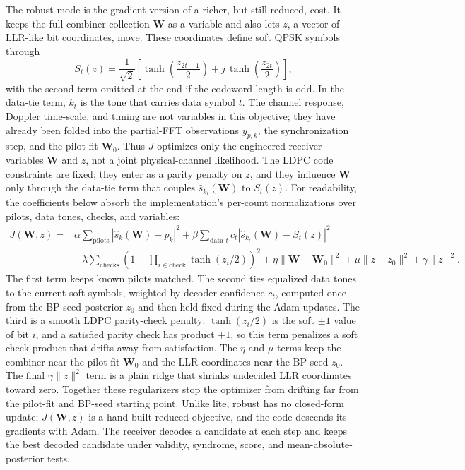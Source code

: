 \documentclass[11pt]{article}
\begin{document}
The robust mode is the gradient version of a richer, but still reduced, cost.
It keeps the full combiner collection \(\mathbf W\) as a variable and also lets
\(z\), a vector of LLR-like bit coordinates, move. These coordinates define
soft QPSK symbols through
\begin{equation}
  S_t(z)=\frac{1}{\sqrt{2}}\left[
    \tanh\!\left(\frac{z_{2t-1}}{2}\right)
    + j\,\tanh\!\left(\frac{z_{2t}}{2}\right)
  \right],
\end{equation}
with the second term omitted at the end if the codeword length is odd. In
the data-tie term, \(k_t\) is the tone that carries data symbol \(t\). The
channel response, Doppler time-scale, and timing are not variables in this
objective; they have already been folded into the partial-FFT observations
\(y_{p,k}\), the synchronization step, and the pilot fit \(\mathbf W_0\). Thus \(J\)
optimizes only the engineered receiver variables \(\mathbf W\) and \(z\), not a joint
physical-channel likelihood. The LDPC code constraints are fixed; they enter as
a parity penalty on \(z\), and they influence \(\mathbf W\) only through the
data-tie term that couples \(\hat{s}_{k_t}(\mathbf W)\) to \(S_t(z)\). For
readability, the coefficients below absorb the implementation's per-count
normalizations over pilots, data tones, checks, and variables:
\begin{equation}
\begin{aligned}
J(\mathbf W,z) ={}&
  \alpha\sum_{\text{pilots}}\left|\hat{s}_k(\mathbf W)-p_k\right|^2
  + \beta\sum_{\text{data }t} c_t
      \left|\hat{s}_{k_t}(\mathbf W)-S_t(z)\right|^2 \\
&+ \lambda\sum_{\text{checks}}
      \left(1-\prod_{i\in\text{check}}\tanh(z_i/2)\right)^2
  + \eta\|\mathbf W-\mathbf W_0\|^2
  + \mu\|z-z_0\|^2
  + \gamma\|z\|^2 .
\end{aligned}
\end{equation}
The first term keeps known pilots matched. The second ties equalized data tones
to the current soft symbols, weighted by decoder confidence \(c_t\), computed
once from the BP-seed posterior \(z_0\) and then held fixed during the Adam
updates. The third is a smooth LDPC parity-check penalty: \(\tanh(z_i/2)\) is
the soft \(\pm1\) value of bit \(i\), and a satisfied parity check has product
\(+1\), so this term penalizes a soft check product that drifts away from
satisfaction. The \(\eta\) and \(\mu\) terms keep the combiner near the pilot
fit \(\mathbf W_0\) and the LLR coordinates near the BP seed \(z_0\). The final
\(\gamma\|z\|^2\) term is a plain ridge that shrinks undecided LLR coordinates
toward zero. Together these regularizers stop the optimizer from drifting far
from the pilot-fit and BP-seed starting point. Unlike lite, robust has no
closed-form update; \(J(\mathbf W,z)\) is a hand-built reduced objective, and the code
descends its gradients with Adam. The receiver decodes a candidate at each step
and keeps the best decoded candidate under validity, syndrome, score, and
mean-absolute-posterior tests.
\end{document}
